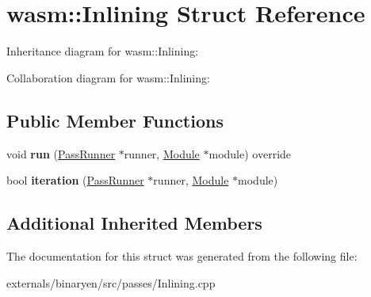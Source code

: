 \hypertarget{structwasm_1_1_inlining}{}\section{wasm\+:\+:Inlining Struct Reference}
\label{structwasm_1_1_inlining}


Inheritance diagram for wasm\+:\+:Inlining\+:


Collaboration diagram for wasm\+:\+:Inlining\+:
\subsection*{Public Member Functions}
\begin{DoxyCompactItemize}
\item 
\mbox{\label{structwasm_1_1_inlining_a1d87111d4ebd4bab4b9b91e1a83ee76d}} 
void {\bfseries run} (\mbox{\hyperlink{structwasm_1_1_pass_runner}{Pass\+Runner}} $\ast$runner, \mbox{\hyperlink{classwasm_1_1_module}{Module}} $\ast$module) override
\item 
\mbox{\label{structwasm_1_1_inlining_ad33b8d729c2d5cca53e7fb2f20777421}} 
bool {\bfseries iteration} (\mbox{\hyperlink{structwasm_1_1_pass_runner}{Pass\+Runner}} $\ast$runner, \mbox{\hyperlink{classwasm_1_1_module}{Module}} $\ast$module)
\end{DoxyCompactItemize}
\subsection*{Additional Inherited Members}


The documentation for this struct was generated from the following file\+:\begin{DoxyCompactItemize}
\item 
externals/binaryen/src/passes/Inlining.\+cpp\end{DoxyCompactItemize}
